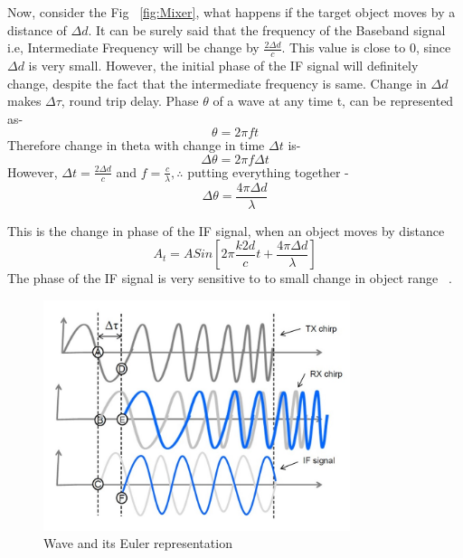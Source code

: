 Now, consider the Fig ~\ref{fig:Mixer}, what happens if the target object moves by a distance of $\Delta d$. It can be surely said that the frequency of the Baseband signal i.e, Intermediate Frequency will be change by $\frac{2\Delta d}{c}$. This value is close to 0, since $\Delta d$ is very small. However, the initial phase of the IF signal will definitely change, despite the fact that the intermediate frequency is same. Change in $\Delta d$ makes $\Delta\tau$, round trip delay.
Phase $\theta$ of a wave at any time t, can be represented as-
 \begin{equation}
     \theta= 2\pi ft
 \end{equation}
Therefore change in theta with change in time $\Delta t$ is-
 \begin{equation}
     \Delta\theta= 2\pi f\Delta t
 \end{equation}
 However, $\Delta t= \frac{2\Delta d}{c}$ and $f= \frac{c}{\lambda},  \therefore$ putting everything together - 
 \begin{equation}\label{eq:theta}
     \Delta\theta= \frac{4\pi \Delta d}{\lambda}
 \end{equation} 

This is the change in phase of the IF signal, when an object moves by distance 
\begin{equation}\label{eq:eq1}
A_{t}= ASin[2\pi \frac{k2d}{c}t + \frac{4\pi \Delta d}{\lambda}]
\end{equation}
The phase of the IF signal is very sensitive to to small change in object range ~\cite{rao_2017}.

 \begin{figure}[ht]
  \begin{center}
    \includegraphics[width=0.8\textwidth]{Master's thesis/images/delay.jpg} 
    \caption{Wave and its Euler representation}
    \label{fig:delay}
  \end{center}
\end{figure}  

